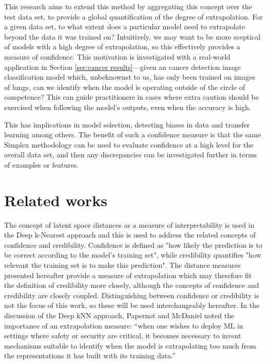 \documentclass{article}
\begin{document}
This research aims to extend this method by aggregating this concept over the test data set, to provide a global quantification of the degree of extrapolation. For a given data set, to what extent does a particular model need to extrapolate beyond the data it was trained on? Intuitively, we may want to be more sceptical of models with a high degree of extrapolation, so this effectively provides a measure of confidence. This motivation is investigated with a real-world application in Section \ref{sec:cancer results}---given an cancer detection image classification model which, unbeknownst to us, has only been trained on images of lungs, can we identify when the model is operating outside of the circle of competence? This can guide practitioners in cases where extra caution should be exercised when following the model's outputs, even when the accuracy is high.

This has implications in model selection, detecting biases in data and transfer learning among others. The benefit of such a confidence measure is that the same Simplex methodology can be used to evaluate confidence at a high level for the overall data set, and then any discrepancies can be investigated further in terms of examples or features.



\section{Related works}

The concept of latent space distances as a measure of interpretability is used in the Deep k-Nearest approach \cite{papernot_deep_2018} and this is used to address the related concepts of confidence and credibility. Confidence is defined as "how likely the prediction is to be correct according to the model’s training set", while credibility quantifies "how relevant the training set is to make this prediction". The distance measures presented hereafter provide a measure of extrapolation which may therefore fit the definition of credibility more closely, although the concepts of confidence and credibility are closely coupled. Distinguishing between confidence or credibility is not the focus of this work, so these will be used interchangeably hereafter. In the discussion of the Deep kNN approach, Papernot and McDaniel noted the importance of an extrapolation measure: “when one wishes to deploy ML in settings where safety or security are critical, it becomes necessary to invent mechanisms suitable to identify when the model is extrapolating too much from the representations it has built with its training data.”
\end{document}
